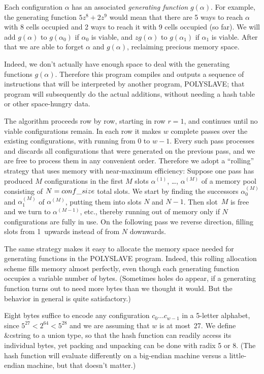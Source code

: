 Each configuration $\alpha$ has an associated {\it generating function\/}
$g(\alpha)$. For example, the generating function $5z^8+2z^9$ would mean that
there are 5 ways to reach $\alpha$ with 8 cells occupied and 2 ways to reach
it with 9 cells occupied (so far). We will add $g(\alpha)$ to $g(\alpha_0)$ if
$\alpha_0$ is viable, and $zg(\alpha)$ to $g(\alpha_1)$ if $\alpha_1$ is
viable. After that we are able to forget $\alpha$ and $g(\alpha)$,
reclaiming precious memory space.

Indeed, we don't actually have enough space to deal with the generating
functions $g(\alpha)$. Therefore this program compiles and outputs a sequence
of instructions that will be interpreted by another program, {\mc POLYSLAVE};
that program will subsequently do the actual additions, without needing a hash
table or other space-hungry data.

The algorithm proceeds row by row, starting in row $r=1$, and continues until
no viable configurations remain. In each row it makes $w$ complete passes
over the existing configurations, with  running from 0 to
$w-1$.
Every such pass processes and discards all configurations that were generated
on the previous pass, and we are free to process them in any convenient
order. Therefore we adopt a ``rolling'' strategy that uses memory with
near-maximum efficiency: Suppose one pass has produced $M$ configurations
in the first $M$ slots $\alpha^{(1)}$, \dots, $\alpha^{(M)}$ of a memory pool
consisting of $N=\relax{\\{conf\_size}}$ total slots. We start by finding the
successors $\alpha^{(M)}_0$ and $\alpha^{(M)}_1$ of $\alpha^{(M)}$, putting
them into slots $N$ and $N-1$. Then slot~$M$ is free and we turn to
$\alpha^{(M-1)}$, etc., thereby running out of memory only if $N$
configurations are fully in use. On the following pass we reverse direction,
filling slots from 1~upwards instead of from $N$ downwards.

The same strategy makes it easy to allocate the memory space needed for
generating functions in the {\mc POLYSLAVE} program. Indeed, this rolling
allocation scheme fills memory almost perfectly, even though each generating
function occupies a variable number of bytes. (Sometimes holes do appear,
if a generating function turns out to need more bytes than we thought it
would. But the behavior in general is quite satisfactory.)

\fi

Eight bytes suffice to encode any configuration $c_0\ldots c_{w-1}$ in a
5-letter alphabet, since $5^{27}<2^{64}<5^{28}$ and we are assuming that $w$ is
at most~27. We define \&{cstring} to a union type, so that the hash function
can readily access its individual bytes, yet packing and unpacking can be done
with radix 5 or 8. (The hash function will evaluate differently on a
big-endian machine versus a little-endian machine, but that doesn't matter.)

